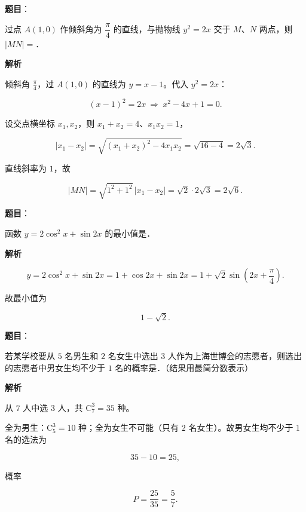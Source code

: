 \begin{answer}

\textbf{题目}：

过点 $A(1,0)$ 作倾斜角为 $\dfrac{\pi}{4}$ 的直线，与抛物线 $y^2=2x$ 交于 $M$、$N$ 两点，则 $|MN|=$\gkblank{}．

\textbf{解析}

倾斜角 $\frac{\pi}{4}$，过 $A(1,0)$ 的直线为 $y=x-1$。代入 $y^2=2x$：

\nopagebreak[4]
\[(x-1)^2=2x\ \Longrightarrow\ x^2-4x+1=0 .\]

设交点横坐标 $x_1,x_2$，则 $x_1+x_2=4$、$x_1x_2=1$，

\nopagebreak[4]
\[|x_1-x_2|=\sqrt{(x_1+x_2)^2-4x_1x_2}=\sqrt{16-4}=2\sqrt3 .\]

直线斜率为 $1$，故

\nopagebreak[4]
\[|MN|=\sqrt{1^2+1^2}\,|x_1-x_2|=\sqrt2\cdot2\sqrt3=2\sqrt6 .\]


\end{answer}
\begin{answer}

\textbf{题目}：

函数 $y=2\cos^2x+\sin2x$ 的最小值是\gkblank{}．

\textbf{解析}

\nopagebreak[4]
\[y=2\cos^2x+\sin2x=1+\cos2x+\sin2x
=1+\sqrt2\sin\left(2x+\frac\pi4\right).\]

故最小值为

\nopagebreak[4]
\[1-\sqrt2 .\]


\end{answer}
\begin{answer}

\textbf{题目}：

若某学校要从 $5$ 名男生和 $2$ 名女生中选出 $3$ 人作为上海世博会的志愿者，则选出的志愿者中男女生均不少于 $1$ 名的概率是\gkblank{}．（结果用最简分数表示）

\textbf{解析}

从 $7$ 人中选 $3$ 人，共 $\mathrm C_7^3=35$ 种。

全为男生：$\mathrm C_5^3=10$ 种；全为女生不可能（只有 $2$ 名女生）。故男女生均不少于 $1$ 名的选法为

\nopagebreak[4]
\[35-10=25,\]

概率

\nopagebreak[4]
\[P=\frac{25}{35}=\frac57 .\]


\end{answer}
